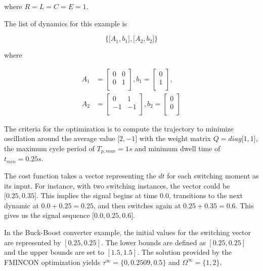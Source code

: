 \noindent
where $R = L = C = E = 1$. 

The list of dynamics for this example is

\noindent
\begin{equation}
    \Big\{\big[A_1,b_1\big], \big[A_2,b_2\big]\Big\}
\end{equation}

\noindent
where

\noindent
\begin{align}
    A_1 &= \left[
        \begin{matrix}
            0 & 0 \\ 
            0 & 1 \\ 
        \end{matrix}
    \right],
    b_1 = \left[
        \begin{matrix}
            0 \\ 
            1 \\ 
        \end{matrix}
    \right], \\
    A_2 &= \left[
        \begin{matrix}
            0 & 1 \\ 
            -1 & -1 \\ 
        \end{matrix}
    \right],
    b_2 = \left[
        \begin{matrix}
            0 \\ 
            0 \\ 
        \end{matrix}
    \right]
\end{align}

The criteria for the optimization is to compute the trajectory to minimize oscillation around the average value 
$\big[2,-1\big]$ with the weight matrix $Q = diag\big[1,1\big]$, the maximum cycle period of $T_{p,max} = 1s$ and minimum 
dwell time of $t_{min} = 0.25s$.

The cost function takes a vector representing the \( dt \) for each switching moment as its 
input. For instance, with two switching instances, the vector could be \(\big[ 0.25, 0.35\big]\). 
This implies the signal begins at time \(0.0\), transitions to the next dynamic at \(0.0 + 0.25 
= 0.25\), and then switches again at \(0.25 + 0.35 = 0.6\). This gives us the signal sequence 
\(\big[0.0, 0.25, 0.6\big]\).

In the Buck-Boost converter example, the initial values for the switching vector are represented 
by \([0.25, 0.25]\). The lower bounds are defined as \([0.25, 0.25]\) and the upper bounds 
are set to \([1.5, 1.5]\). The solution provided by the FMINCON optimization yields 
\(\tau^\infty = \{0, 0.2509, 0.5\}\) and \(\Omega^\infty = \{1, 2\}\).

